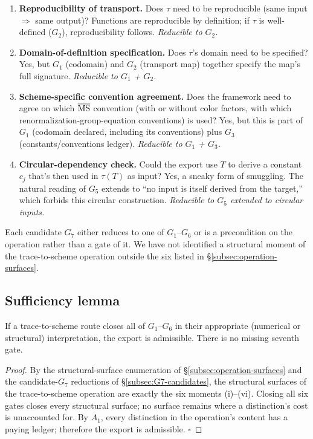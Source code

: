 \begin{enumerate}
\item \textbf{Reproducibility of transport.} Does $\tau$ need to be reproducible (same input $\Rightarrow$ same output)? Functions are reproducible by definition; if $\tau$ is well-defined ($G_2$), reproducibility follows. \emph{Reducible to $G_2$.}

\item \textbf{Domain-of-definition specification.} Does $\tau$'s domain need to be specified? Yes, but $G_1$ (codomain) and $G_2$ (transport map) together specify the map's full signature. \emph{Reducible to $G_1$ + $G_2$.}

\item \textbf{Scheme-specific convention agreement.} Does the framework need to agree on which $\overline{\rm MS}$ convention (with or without color factors, with which renormalization-group-equation conventions) is used? Yes, but this is part of $G_1$ (codomain declared, including its conventions) plus $G_3$ (constants/conventions ledger). \emph{Reducible to $G_1$ + $G_3$.}

\item \textbf{Circular-dependency check.} Could the export use $T$ to derive a constant $c_j$ that's then used in $\tau(T)$ as input? Yes, a sneaky form of smuggling. The natural reading of $G_5$ extends to ``no input is itself derived from the target,'' which forbids this circular construction. \emph{Reducible to $G_5$ extended to circular inputs.}
\end{enumerate}

Each candidate $G_7$ either reduces to one of $G_1$--$G_6$ or is a precondition on the operation rather than a gate of it. We have not identified a structural moment of the trace-to-scheme operation outside the six listed in \S\ref{subsec:operation-surfaces}.

\subsection{Sufficiency lemma}
\label{subsec:sufficiency-lemma}

\begin{lemma}[Sufficiency of $G_1$--$G_6$]
\label{lem:sufficiency}
If a trace-to-scheme route closes all of $G_1$--$G_6$ in their appropriate (numerical or structural) interpretation, the export is admissible. There is no missing seventh gate.
\end{lemma}

\begin{proof}
By the structural-surface enumeration of \S\ref{subsec:operation-surfaces} and the candidate-$G_7$ reductions of \S\ref{subsec:G7-candidates}, the structural surfaces of the trace-to-scheme operation are exactly the six moments (i)--(vi). Closing all six gates closes every structural surface; no surface remains where a distinction's cost is unaccounted for. By $A_1$, every distinction in the operation's content has a paying ledger; therefore the export is admissible. $\square$
\end{proof}

